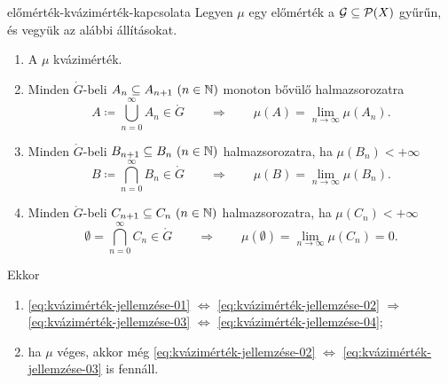 \documentclass[
]{elteikthesis}[2024/04/26]
\begin{document}
	\begin{theorem}{}{előmérték-kvázimérték-kapcsolata}
		Legyen \( \mu \) egy előmérték a \( \mathcal{G} \subseteq \mathcal{P}( X ) \) gyűrűn,
		és vegyük az alábbi állításokat.
		\begin{enumerate}[label=\alph*)]
			\item\label{eq:kvázimérték-jellemzése-01} A \( \mu \) kvázimérték.
			
			\item\label{eq:kvázimérték-jellemzése-02}
			Minden \( \ring{G} \)-beli \( A_n \subseteq A_{n + 1} \ (n \in \mathbb{N}) \) 
			monoton bővülő halmazsorozatra
			\[
				A \coloneq \bigcup_{n=0}^{\infty} A_n \in \ring{G}
				\qquad \Longrightarrow \qquad
				\mu(A) = \lim_{n \to \infty} \mu(A_n).
			\]
			
			\item\label{eq:kvázimérték-jellemzése-03}
			Minden \( \ring{G} \)-beli \( B_{n + 1} \subseteq B_n \ (n \in \mathbb{N}) \)
			halmazsorozatra, ha \( \mu(B_n) < +\infty \)
			\[
				B \coloneq \bigcap_{n=0}^{\infty} B_n \in \ring{G}
				\qquad \Longrightarrow \qquad
				\mu(B) = \lim_{n \to \infty} \mu(B_n).
			\]
			
			\item{}\label{eq:kvázimérték-jellemzése-04} 
			Minden \( \ring{G} \)-beli \( C_{n + 1} \subseteq C_n \ (n \in \mathbb{N}) \)
			halmazsorozatra, ha \( \mu(C_n) < +\infty \)
			\[
				\emptyset = \bigcap_{n=0}^{\infty} C_n \in \ring{G}
				\qquad \Longrightarrow \qquad
				\mu(\emptyset) = \lim_{n \to \infty} \mu(C_n) = 0.
			\]
		\end{enumerate}
		Ekkor
		\begin{enumerate}
			\item 
			\ref{eq:kvázimérték-jellemzése-01} \( \Longleftrightarrow \)
			\ref{eq:kvázimérték-jellemzése-02} \( \Longrightarrow \)
			\ref{eq:kvázimérték-jellemzése-03} \( \Longleftrightarrow \)
			\ref{eq:kvázimérték-jellemzése-04};
			
			\item ha \( \mu \) véges, akkor még 
			\ref{eq:kvázimérték-jellemzése-02} \( \Longleftrightarrow \)
			\ref{eq:kvázimérték-jellemzése-03} is fennáll.
		\end{enumerate}
	\end{theorem}
\end{document}
